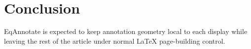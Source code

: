 \documentclass[conference]{IEEEtran}
\begin{document}
\section{Conclusion}
EqAnnotate is expected to keep annotation geometry local to each display while leaving the rest of the article under normal LaTeX page-building control.
\end{document}
